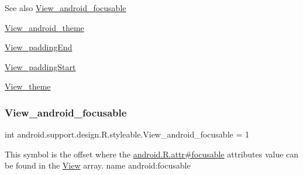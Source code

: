\begin{DoxySeeAlso}{See also}
\hyperlink{classandroid_1_1support_1_1design_1_1R_1_1styleable_a1e688704d10e03014118a9af99770e9d}{View\+\_\+android\+\_\+focusable} 

\hyperlink{classandroid_1_1support_1_1design_1_1R_1_1styleable_a57c0fdcca2016b94e23a1f36f889f581}{View\+\_\+android\+\_\+theme} 

\hyperlink{classandroid_1_1support_1_1design_1_1R_1_1styleable_afd6c00810c12a8e9da050dd3fc5d31ff}{View\+\_\+padding\+End} 

\hyperlink{classandroid_1_1support_1_1design_1_1R_1_1styleable_a39729af0c88068197b82555ede76dbd1}{View\+\_\+padding\+Start} 

\hyperlink{classandroid_1_1support_1_1design_1_1R_1_1styleable_a9ec1420eec04ffdfd76d5ad0ea0818ef}{View\+\_\+theme} 
\end{DoxySeeAlso}
\mbox{\label{classandroid_1_1support_1_1design_1_1R_1_1styleable_a1e688704d10e03014118a9af99770e9d}} 
\subsubsection{\texorpdfstring{View\+\_\+android\+\_\+focusable}{View\_android\_focusable}}
{\footnotesize\ttfamily int android.\+support.\+design.\+R.\+styleable.\+View\+\_\+android\+\_\+focusable = 1\hspace{0.3cm}{\ttfamily [static]}}

This symbol is the offset where the \hyperlink{}{android.\+R.\+attr\#focusable} attribute\textquotesingle{}s value can be found in the \hyperlink{classandroid_1_1support_1_1design_1_1R_1_1styleable_ae848bcf5b638b9248537d28ebf90c67f}{View} array.  name android\+:focusable \mbox{\label{classandroid_1_1support_1_1design_1_1R_1_1styleable_a57c0fdcca2016b94e23a1f36f889f581}} 
